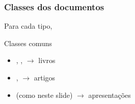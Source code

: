 \begin{frame}
\frametitle{Classes dos documentos}

Para cada tipo, 


\begin{block}{}\centering
  \texttt{\large\purple{\string\documentclass}}\par
\end{block}

\begin{block}{Classes comuns}
  \begin{itemize}
  \item {}, ,  $\to$ livros
  \item {},  $\to$ artigos
  \item {} (como neste slide) $\to$ apresentações
  \end{itemize}
\end{block}


\end{frame}

